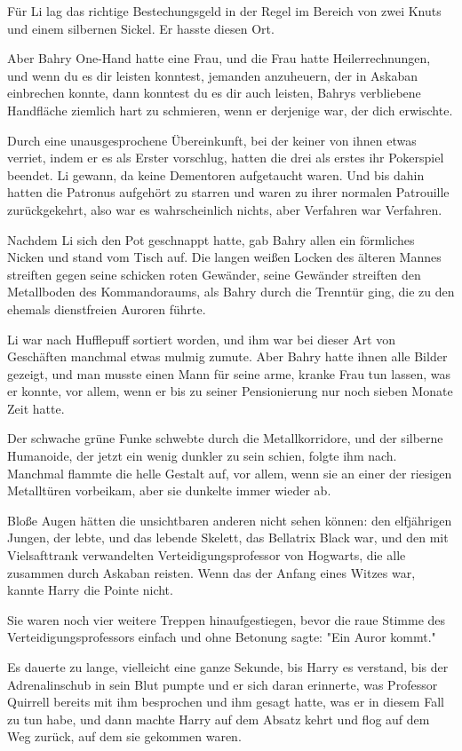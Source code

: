 {Für Li lag das richtige Bestechungsgeld in der Regel im Bereich von zwei Knuts und einem silbernen Sickel. Er hasste diesen Ort.

Aber Bahry One-Hand hatte eine Frau, und die Frau hatte Heilerrechnungen, und wenn du es dir leisten konntest, jemanden anzuheuern, der in Askaban einbrechen konnte, dann konntest du es dir auch leisten, Bahrys verbliebene Handfläche ziemlich hart zu schmieren, wenn er derjenige war, der dich erwischte.

Durch eine unausgesprochene Übereinkunft, bei der keiner von ihnen etwas verriet, indem er es als Erster vorschlug, hatten die drei als erstes ihr Pokerspiel beendet. Li gewann, da keine Dementoren aufgetaucht waren. Und bis dahin hatten die Patronus aufgehört zu starren und waren zu ihrer normalen Patrouille zurückgekehrt, also war es wahrscheinlich nichts, aber Verfahren war Verfahren.

Nachdem Li sich den Pot geschnappt hatte, gab Bahry allen ein förmliches Nicken und stand vom Tisch auf. Die langen weißen Locken des älteren Mannes streiften gegen seine schicken roten Gewänder, seine Gewänder streiften den Metallboden des Kommandoraums, als Bahry durch die Trenntür ging, die zu den ehemals dienstfreien Auroren führte.

Li war nach Hufflepuff sortiert worden, und ihm war bei dieser Art von Geschäften manchmal etwas mulmig zumute. Aber Bahry hatte ihnen alle Bilder gezeigt, und man musste einen Mann für seine arme, kranke Frau tun lassen, was er konnte, vor allem, wenn er bis zu seiner Pensionierung nur noch sieben Monate Zeit hatte.

Der schwache grüne Funke schwebte durch die Metallkorridore, und der silberne Humanoide, der jetzt ein wenig dunkler zu sein schien, folgte ihm nach. Manchmal flammte die helle Gestalt auf, vor allem, wenn sie an einer der riesigen Metalltüren vorbeikam, aber sie dunkelte immer wieder ab.

Bloße Augen hätten die unsichtbaren anderen nicht sehen können: den elfjährigen Jungen, der lebte, und das lebende Skelett, das Bellatrix Black war, und den mit Vielsafttrank verwandelten Verteidigungsprofessor von Hogwarts, die alle zusammen durch Askaban reisten. Wenn das der Anfang eines Witzes war, kannte Harry die Pointe nicht.

Sie waren noch vier weitere Treppen hinaufgestiegen, bevor die raue Stimme des Verteidigungsprofessors einfach und ohne Betonung sagte: "Ein Auror kommt."

Es dauerte zu lange, vielleicht eine ganze Sekunde, bis Harry es verstand, bis der Adrenalinschub in sein Blut pumpte und er sich daran erinnerte, was Professor Quirrell bereits mit ihm besprochen und ihm gesagt hatte, was er in diesem Fall zu tun habe, und dann machte Harry auf dem Absatz kehrt und flog auf dem Weg zurück, auf dem sie gekommen waren.

}
